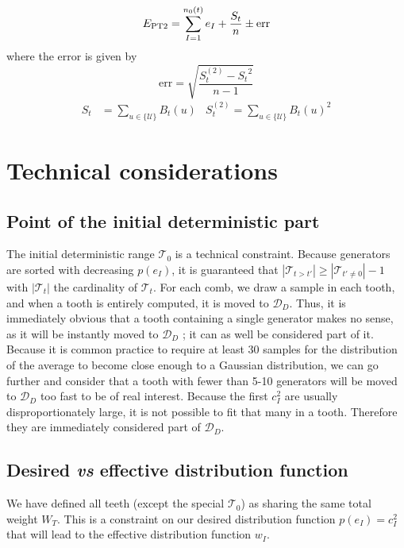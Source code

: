 \documentclass[./thesis.tex]{subfiles}
\begin{document}
\begin{equation}
E_\text{PT2} = \sum_{I=1}^{n_0(t)} e_I + \frac{S_{t}}{n}  \pm \text{err}
\end{equation}
where the error is given by
\begin{equation}
\text{err}  = \sqrt{\frac{S_{t}^{(2)} - {S_{t}}^2}{n-1} } 
\end{equation}
\begin{align}
S_{t} & = \sum_{u \in \{\mathcal{U}\}} B_{t}(u) & 
S^{(2)}_{t} = \sum_{u \in \{\mathcal{U}\}} B_{t}(u)^2
\end{align}


\section{Technical considerations}


\subsection{Point of the initial deterministic part}

The initial deterministic range $\mathcal{T}_0$ is a technical constraint.
Because generators are sorted with decreasing $p(e_I)$, it is guaranteed that $|\mathcal{T}_{t>t'}| \geq |\mathcal{T}_{t' \neq 0}|-1$ with $|\mathcal{T}_t|$ the cardinality of $\mathcal{T}_t$.
For each comb, we draw a sample in each tooth, and when a tooth is entirely computed, it is moved to $\mathcal{D}_D$. Thus, it is immediately obvious that a tooth containing a single generator makes no sense, as it will be instantly moved to $\mathcal{D}_D$ ; it can as well be considered part of it. Because it is common practice to require at least 30 samples for the distribution of the average to become close enough to a Gaussian distribution,\cite{Hogg2014Jan} we can go further and consider that a tooth with fewer than 5-10 generators will be moved to $\mathcal{D}_D$ too fast to be of real interest. Because the first $c_I^2$ are usually disproportionately large, it is not possible to fit that many in a tooth. Therefore they are immediately considered part of $\mathcal{D}_D$.

\subsection{Desired \textit{vs} effective distribution function}
\label{sec:pt2_distribution}

We have defined all teeth (except the special $\mathcal{T}_0$) as sharing the same total weight $W_T$. This is a constraint on our desired distribution function $p(e_I) = c_I^2$ that will lead to the effective distribution function $w_I$.
\end{document}
